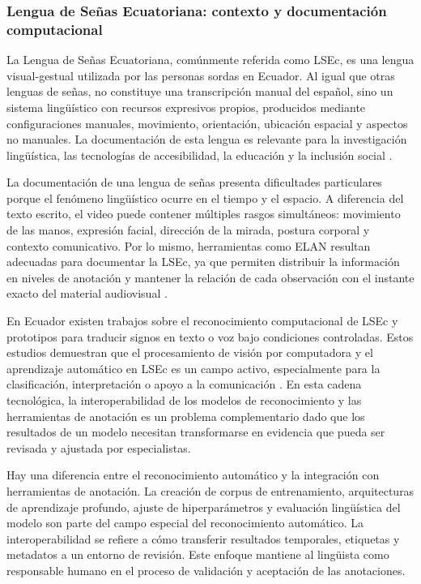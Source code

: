 \subsubsection{Lengua de Señas Ecuatoriana: contexto y documentación computacional}

La Lengua de Señas Ecuatoriana, comúnmente referida como LSEc, es una lengua visual-gestual utilizada por las personas sordas en Ecuador. Al igual que otras lenguas de señas, no constituye una transcripción manual del español, sino un sistema lingüístico con recursos expresivos propios, producidos mediante configuraciones manuales, movimiento, orientación, ubicación espacial y aspectos no manuales. La documentación de esta lengua es relevante para la investigación lingüística, las tecnologías de accesibilidad, la educación y la inclusión social \cite{ureta2022lsec_inclusion}.

La documentación de una lengua de señas presenta dificultades particulares porque el fenómeno lingüístico ocurre en el tiempo y el espacio. A diferencia del texto escrito, el video puede contener múltiples rasgos simultáneos: movimiento de las manos, expresión facial, dirección de la mirada, postura corporal y contexto comunicativo. Por lo mismo, herramientas como ELAN resultan adecuadas para documentar la LSEc, ya que permiten distribuir la información en niveles de anotación y mantener la relación de cada observación con el instante exacto del material audiovisual \cite{wittenburg2006elan,ureta2022lsec_inclusion}.

En Ecuador existen trabajos sobre el reconocimiento computacional de LSEc y prototipos para traducir signos en texto o voz bajo condiciones controladas. Estos estudios demuestran que el procesamiento de visión por computadora y el aprendizaje automático en LSEc es un campo activo, especialmente para la clasificación, interpretación o apoyo a la comunicación \cite{guevara2022lsec_interprete,cruz2025prototipo}. En esta cadena tecnológica, la interoperabilidad de los modelos de reconocimiento y las herramientas de anotación es un problema complementario dado que los resultados de un modelo necesitan transformarse en evidencia que pueda ser revisada y ajustada por especialistas.

Hay una diferencia entre el reconocimiento automático y la integración con herramientas de anotación. La creación de corpus de entrenamiento, arquitecturas de aprendizaje profundo, ajuste de hiperparámetros y evaluación lingüística del modelo son parte del campo especial del reconocimiento automático. La interoperabilidad se refiere a cómo transferir resultados temporales, etiquetas y metadatos a un entorno de revisión. Este enfoque mantiene al lingüista como responsable humano en el proceso de validación y aceptación de las anotaciones.

